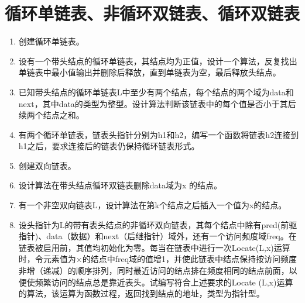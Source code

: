 \documentclass[lang=cn,newtx,10pt,scheme=chinese]{../../elegantbook}
\begin{document}
\chapter{循环单链表、非循环双链表、循环双链表}
\begin{enumerate}
\def\labelenumi{\arabic{enumi}.}
\item
  
  创建循环单链表。
  
\vspace{5cm}
\item
  
  设有一个带头结点的循环单链表，其结点均为正值，设计一个算法，反复找出单链表中最小值输出并删除后释放，直到单链表为空，最后释放头结点。
  
\vspace{5cm}
\item
  
  已知带头结点的循环单链表L中至少有两个结点，每个结点的两个域为data和next，其中data的类型为整型。设计算法判断该链表中的每个值是否小于其后续两个结点之和。
  
\vspace{5cm}
\item
  
  有两个循环单链表，链表头指针分别为h1和h2，编写一个函数将链表h2连接到h1之后，要求连接后的链表仍保持循环链表形式。
  
\vspace{5cm}
\item
  
  创建双向链表。
  
\vspace{5cm}
\item
  
  设计算法在带头结点循环双链表删除data域为x 的结点。
  
\vspace{5cm}
\item
  
  有一个非空双向链表L，设计算法在第k个结点之后插入一个值为x的结点。
  
\vspace{5cm}
\item
  
  设头指针为L的带有表头结点的非循环双向链表，其每个结点中除有pred(前驱指针)、data（数据）和next（后继指针）域外，还有一个访问频度域freq。在链表被启用前，其值均初始化为零。每当在链表中进行一次Locate(L,x)运算时，令元素值为×的结点中freq域的值增1，并使此链表中结点保持按访问频度非增（递减）的顺序排列，同时最近访问的结点排在频度相同的结点前面，以便使频繁访问的结点总是靠近表头。试编写符合上述要求的Locate
  (L,x)运算的算法，该运算为函数过程，返回找到结点的地址，类型为指针型。
  

\end{enumerate}
\end{document}
